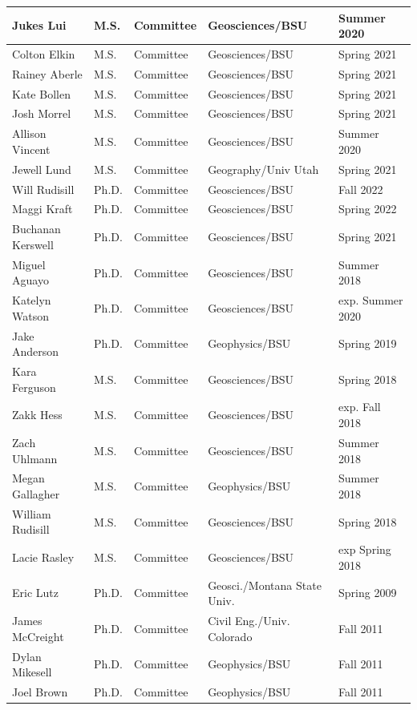\documentclass[11pt]{article}
\begin{document}
\begin{table}[!htbp]
\begin{tabular}{|l|l|l|l|l|}
Jukes Lui & M.S. & Committee & Geosciences/BSU & Summer 2020 \\ \hline
Colton Elkin & M.S. & Committee & Geosciences/BSU & Spring 2021 \\ \hline
Rainey Aberle & M.S. & Committee & Geosciences/BSU & Spring 2021 \\ \hline
Kate Bollen & M.S. & Committee & Geosciences/BSU & Spring 2021 \\ \hline
Josh Morrel & M.S. & Committee & Geosciences/BSU & Spring 2021 \\ \hline
Allison Vincent & M.S. & Committee & Geosciences/BSU & Summer 2020 \\ \hline
Jewell Lund & M.S. & Committee & Geography/Univ Utah & Spring 2021 \\ \hline
Will Rudisill & Ph.D. & Committee & Geosciences/BSU & Fall 2022 \\ \hline
Maggi Kraft & Ph.D. & Committee & Geosciences/BSU & Spring 2022 \\ \hline
Buchanan Kerswell & Ph.D. & Committee & Geosciences/BSU & Spring 2021 \\ \hline
Miguel Aguayo & Ph.D. & Committee & Geosciences/BSU & Summer 2018 \\ \hline
Katelyn Watson & Ph.D. & Committee & Geosciences/BSU & exp. Summer 2020 \\ \hline
Jake Anderson & Ph.D. & Committee & Geophysics/BSU & Spring 2019 \\ \hline
Kara Ferguson & M.S. & Committee & Geosciences/BSU & Spring 2018 \\ \hline
Zakk Hess & M.S. & Committee & Geosciences/BSU & exp. Fall 2018 \\ \hline
Zach Uhlmann & M.S. & Committee & Geosciences/BSU & Summer 2018 \\ \hline
Megan Gallagher & M.S. & Committee & Geophysics/BSU & Summer 2018 \\ \hline
William Rudisill & M.S. & Committee & Geosciences/BSU & Spring 2018 \\ \hline
Lacie Rasley & M.S. & Committee & Geosciences/BSU & exp Spring 2018 \\ \hline
Eric Lutz & Ph.D. & Committee & Geosci./Montana State Univ. & Spring 2009 \\ \hline
James McCreight & Ph.D. & Committee & Civil Eng./Univ. Colorado & Fall 2011 \\ \hline
Dylan Mikesell & Ph.D. & Committee & Geophysics/BSU & Fall 2011 \\ \hline
Joel Brown & Ph.D. & Committee & Geophysics/BSU & Fall 2011 \\ \hline

\end{tabular}
\end{table}
\end{document}
